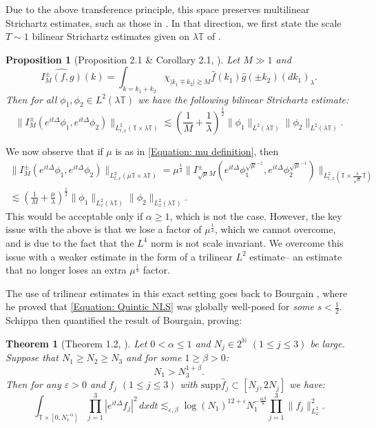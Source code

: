 \documentclass[12pt, letterpaper]{amsart}
\newtheorem{theorem}{Theorem}
\newtheorem{proposition}{Proposition}
\begin{document}
Due to the above transference principle, this space preserves multilinear Strichartz estimates, such as those in \cite{de2007global}. In that direction, we first state the scale $T\sim 1$ bilinear Strichartz estimates given on $\lambda\mathbb{T}$ of \cite{li2011global}.

\begin{proposition}[Proposition 2.1 \& Corollary 2.1, \cite{li2011global}]\label{Proposition: Generic bilinear estimates}
    Let $M \gg 1$ and
    \[
    \widehat{I^{\pm}_M(f,g)}(k) = \int_{k=k_1+k_2}\chi_{|k_1\mp k_2|\gtrsim M}\widehat{f}(k_1)\widehat{g}(\pm k_2)(dk_1)_\lambda.
    \]
    Then for all $\phi_1,\phi_2\in L^2(\lambda\mathbb{T})$ we have the following bilinear Strichartz estimate:
    \[
    \|I^{\pm}_M(e^{it\Delta}\phi_1,e^{it\Delta}\phi_2)\|_{L^2_{t,x}(\mathbb{T}\times\lambda\mathbb{T})}\lesssim \left( \frac{1}{M}+\frac{1}{\lambda}\right)^{\frac12}\|\phi_1\|_{L^2(\lambda \mathbb{T})}\|\phi_2\|_{L^2(\lambda\mathbb{T})}.
    \]
\end{proposition}

We now observe that if $\mu$ is as in \eqref{Equation: mu definition}, then
\begin{multline*}
\|I^{\pm}_M(e^{it\Delta}\phi_1,e^{it\Delta}\phi_2)\|_{L^2_{t,x}(\mu\mathbb{T}\times \lambda\mathbb{T})} = \mu^\frac14\|I^{\pm}_{\sqrt{\mu}M}(e^{it\Delta}\phi_1^{\sqrt{\mu}^{-1}},e^{it\Delta}\phi_2^{\sqrt{\mu}^{-1}})\|_{L^2_{t,x}(\mathbb{T}\times \tfrac{\lambda}{\sqrt{\mu}}\mathbb{T})}\\
\lesssim \left(\frac{1}{M}+\frac{\mu}{\lambda}\right)^\frac12 \|\phi_1\|_{L^2_x(\lambda\mathbb{T})}\|\phi_2\|_{L^2_x(\lambda\mathbb{T})}.
\end{multline*}
This would be acceptable only if $\alpha\geq 1$, which is not the case. However, the key issue with the above is that we lose a factor of $\mu^\frac14$, which we cannot overcome, and is due to the fact that the $L^4$ norm is not scale invariant. We overcome this issue with a weaker estimate in the form of a trilinear $L^2$ estimate-- an estimate that no longer loses an extra $\mu^\frac14$ factor.

The use of trilinear estimates in this exact setting goes back to Bourgain \cite[Lemma 4.1]{MR2124457}, where he proved that \eqref{Equation: Quintic NLS} was globally well-posed for \textit{some} $s < \frac12$. Schippa \cite[Theorem 1.2]{Schippa2024} then quantified the result of Bourgain, proving:
\begin{theorem}[Theorem 1.2, \cite{Schippa2024}]\label{Theorem: Bourgain Trilinear}
Let $0 < \alpha \leq 1$ and $N_j\in 2^\mathbb{N}$ $(1\leq j\leq 3)$ be large. Suppose that $N_1\geq N_2\geq N_3$ and for some $1 \geq \beta > 0$:
\[
N_1 > N_3^{1+\beta}.
\]
Then for any $\varepsilon > 0$ and $f_j$ $(1\leq j\leq 3)$ with $\mathrm{supp }\widehat{f}_j\subset [N_j, 2N_j]$ we have:
\[
\int_{\mathbb{T}\times [0, N_1^{-\alpha}]}\prod_{j=1}^3 |e^{it\Delta}f_j|^2\,dxdt\lesssim_{\varepsilon, \beta}\log(N_1)^{12+\varepsilon}N_1^{-\frac{\alpha\beta}{8}}\prod_{j=1}^3\|f_j\|_{L^2_{x}}^2.
\]
\end{theorem} 
\end{document}
